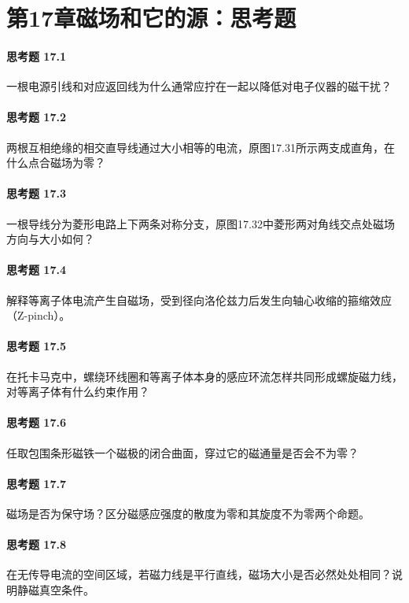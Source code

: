 \section*{第17章\quad 磁场和它的源：思考题}
\paragraph{思考题 17.1}
一根电源引线和对应返回线为什么通常应拧在一起以降低对电子仪器的磁干扰？

\paragraph{思考题 17.2}
两根互相绝缘的相交直导线通过大小相等的电流，原图17.31所示两支成直角，在什么点合磁场为零？

\paragraph{思考题 17.3}
一根导线分为菱形电路上下两条对称分支，原图17.32中菱形两对角线交点处磁场方向与大小如何？

\paragraph{思考题 17.4}
解释等离子体电流产生自磁场，受到径向洛伦兹力后发生向轴心收缩的箍缩效应（Z-pinch）。

\paragraph{思考题 17.5}
在托卡马克中，螺绕环线圈和等离子体本身的感应环流怎样共同形成螺旋磁力线，对等离子体有什么约束作用？

\paragraph{思考题 17.6}
任取包围条形磁铁一个磁极的闭合曲面，穿过它的磁通量是否会不为零？

\paragraph{思考题 17.7}
磁场是否为保守场？区分磁感应强度的散度为零和其旋度不为零两个命题。

\paragraph{思考题 17.8}
在无传导电流的空间区域，若磁力线是平行直线，磁场大小是否必然处处相同？说明静磁真空条件。


